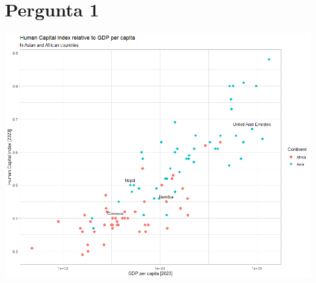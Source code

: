 \documentclass[11pt,a4paper]{article}
\begin{document}
\pagestyle{fancy}

\section*{Pergunta 1}



\vspace{20pt}

\begin{center}
  \includegraphics[width=\linewidth]{pergunta_1.png}
\end{center}
\end{document}
